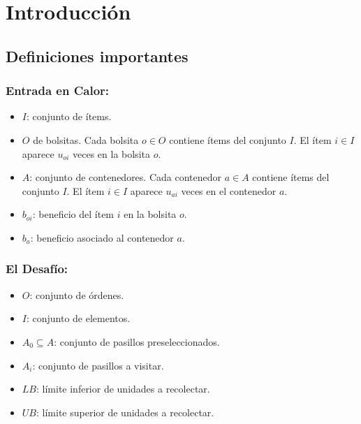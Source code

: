 \documentclass[a4paper,12pt]{article}
\begin{document}
\thispagestyle{empty}
\clearpage

\tableofcontents
\clearpage

\section{Introducción}



\subsection{Definiciones importantes}

\subsubsection*{Entrada en Calor:}

\begin{itemize}
    \item $I$: conjunto de ítems.
    \item $O$ de bolsitas. Cada bolsita $o \in O$ contiene ítems del conjunto $I$. El ítem $i \in I$ aparece $u_{oi}$ veces en la bolsita $o$.
    \item $A$: conjunto de contenedores. Cada contenedor $a \in A$ contiene ítems del conjunto $I$. El ítem $i \in I$ aparece $u_{ai}$ veces en el contenedor $a$.
    \item $b_{oi}$: beneficio del ítem $i$ en la bolsita $o$.
    \item $b_a$: beneficio asociado al contenedor $a$.
    
\end{itemize}

\subsubsection*{El Desafío:}

\begin{itemize}
    \item $O$: conjunto de órdenes.
    \item $I$: conjunto de elementos.
    \item $A_0 \subseteq A$: conjunto de pasillos preseleccionados.
    \item $A_i$: conjunto de pasillos a visitar.
    \item $LB$: límite inferior de unidades a recolectar.
    \item $UB$: límite superior de unidades a recolectar.
\end{itemize}
\end{document}
